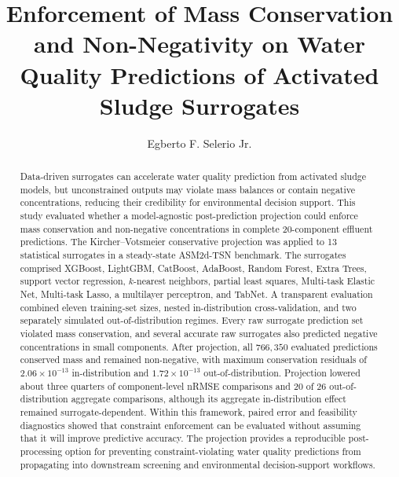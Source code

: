 \documentclass[a4paper,fleqn]{cas-sc}
\begin{document}
\let\WriteBookmarks\relax
\def\floatpagepagefraction{1}
\def\textpagefraction{.001}


\title[mode=title]{Enforcement of Mass Conservation and Non-Negativity on Water Quality Predictions of Activated Sludge Surrogates}

\author[1]{Egberto F. Selerio Jr.}
\cormark[1]



\begin{abstract}
Data-driven surrogates can accelerate water quality prediction from activated sludge models, but unconstrained outputs may violate mass balances or contain negative concentrations, reducing their credibility for environmental decision support. This study evaluated whether a model-agnostic post-prediction projection could enforce mass conservation and non-negative concentrations in complete 20-component effluent predictions. The Kircher--Votsmeier conservative projection was applied to 13 statistical surrogates in a steady-state ASM2d-TSN benchmark. The surrogates comprised XGBoost, LightGBM, CatBoost, AdaBoost, Random Forest, Extra Trees, support vector regression, $k$-nearest neighbors, partial least squares, Multi-task Elastic Net, Multi-task Lasso, a multilayer perceptron, and TabNet. A transparent evaluation combined eleven training-set sizes, nested in-distribution cross-validation, and two separately simulated out-of-distribution regimes. Every raw surrogate prediction set violated mass conservation, and several accurate raw surrogates also predicted negative concentrations in small components. After projection, all $766{,}350$ evaluated predictions conserved mass and remained non-negative, with maximum conservation residuals of $2.06\times10^{-13}$ in-distribution and $1.72\times10^{-13}$ out-of-distribution. Projection lowered about three quarters of component-level nRMSE comparisons and 20 of 26 out-of-distribution aggregate comparisons, although its aggregate in-distribution effect remained surrogate-dependent. Within this framework, paired error and feasibility diagnostics showed that constraint enforcement can be evaluated without assuming that it will improve predictive accuracy. The projection provides a reproducible post-processing option for preventing constraint-violating water quality predictions from propagating into downstream screening and environmental decision-support workflows.
\end{abstract}
\end{document}
